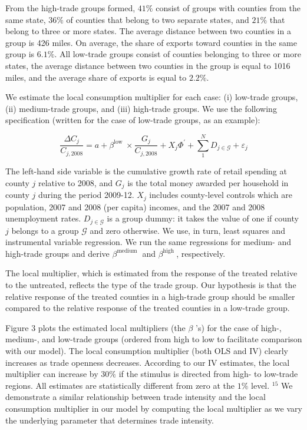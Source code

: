 \documentclass[10pt]{article}
\begin{document}
From the high-trade groups formed, $41 \%$ consist of groups with counties from the same state, $36 \%$ of counties that belong to two separate states, and $21 \%$ that belong to three or more states. The average distance between two counties in a group is 426 miles. On average, the share of exports toward counties in the same group is $6.1 \%$. All low-trade groups consist of counties belonging to three or more states, the average distance between two counties in the group is equal to 1016 miles, and the average share of exports is equal to $2.2 \%$.

We estimate the local consumption multiplier for each case: (i) low-trade groups, (ii) medium-trade groups, and (iii) high-trade groups. We use the following specification (written for the case of low-trade groups, as an example):


\begin{equation*}
\frac{\Delta C_{j}}{C_{j, 2008}}=a+\beta^{\text {low }} \times \frac{G_{j}}{C_{j, 2008}}+X_{j} \Phi^{\prime}+\sum_{1}^{N} D_{j \in \mathcal{G}}+\varepsilon_{j} \tag{3.4}
\end{equation*}


The left-hand side variable is the cumulative growth rate of retail spending at county $j$ relative to 2008, and $G_{j}$ is the total money awarded per household in county $j$ during the period 2009-12. $X_{j}$ includes county-level controls which are population, 2007 and 2008 (per capita) incomes, and the 2007 and 2008 unemployment rates. $D_{j \in \mathcal{G}}$ is a group dummy: it takes the value of one if county $j$ belongs to a group $\mathcal{G}$ and zero otherwise. We use, in turn, least squares and instrumental variable regression. We run the same regressions for medium- and high-trade groups and derive $\beta^{\text {medium }}$ and $\beta^{\text {high }}$, respectively.

The local multiplier, which is estimated from the response of the treated relative to the untreated, reflects the type of the trade group. Our hypothesis is that the relative response of the treated counties in a high-trade group should be smaller compared to the relative response of the treated counties in a low-trade group.

Figure 3 plots the estimated local multipliers (the $\beta$ 's) for the case of high-, medium-, and low-trade groups (ordered from high to low to facilitate comparison with our model). The local consumption multiplier (both OLS and IV) clearly increases as trade openness decreases. According to our IV estimates, the local multiplier can increase by $30 \%$ if the stimulus is directed from high- to low-trade regions. All estimates are statistically different from zero at the $1 \%$ level. ${ }^{15}$ We demonstrate a similar relationship between trade intensity and the local consumption multiplier in our model by computing the local multiplier as we vary the underlying parameter that determines trade intensity.
\end{document}

